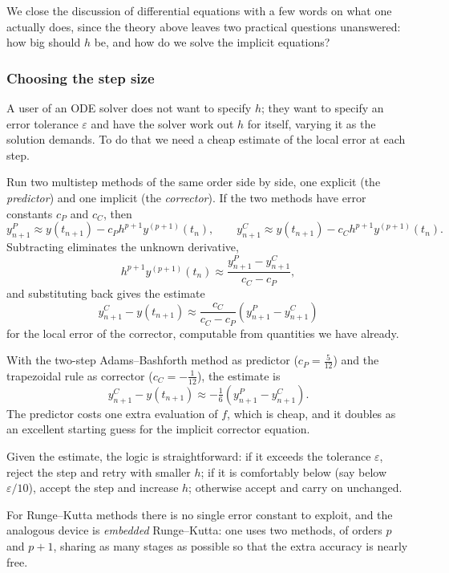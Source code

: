 \documentclass[a4paper]{scrartcl}
\begin{document}
We close the discussion of differential equations with a few words on what one actually does, since the theory above leaves two practical questions unanswered: how big should $h$ be, and how do we solve the implicit equations?

\subsubsection*{Choosing the step size}

A user of an ODE solver does not want to specify $h$; they want to specify an error tolerance $\varepsilon$ and have the solver work out $h$ for itself, varying it as the solution demands. To do that we need a cheap estimate of the local error at each step.

\begin{method}
  Run two multistep methods of the same order side by side, one explicit (the \emph{predictor}) and one implicit (the \emph{corrector}). If the two methods have error constants $c_P$ and $c_C$, then
  $$
  y^{P}_{n+1} \approx y(t_{n+1}) - c_P h^{p+1}y^{(p+1)}(t_n), \qquad y^{C}_{n+1} \approx y(t_{n+1}) - c_C h^{p+1}y^{(p+1)}(t_n).
  $$
  Subtracting eliminates the unknown derivative,
  $$
  h^{p+1}y^{(p+1)}(t_n) \approx \frac{y^P_{n+1} - y^C_{n+1}}{c_C - c_P},
  $$
  and substituting back gives the estimate
  $$
  y^C_{n+1} - y(t_{n+1}) \approx \frac{c_C}{c_C - c_P}\left(y^P_{n+1} - y^C_{n+1}\right)
  $$
  for the local error of the corrector, computable from quantities we have already.
\end{method}

\begin{example}
  With the two-step Adams--Bashforth method as predictor ($c_P = \tfrac{5}{12}$) and the trapezoidal rule as corrector ($c_C = -\tfrac1{12}$), the estimate is
  $$
  y^{C}_{n+1} - y(t_{n+1}) \approx -\tfrac16\left(y^{P}_{n+1} - y^{C}_{n+1}\right).
  $$
  The predictor costs one extra evaluation of $f$, which is cheap, and it doubles as an excellent starting guess for the implicit corrector equation.
\end{example}

Given the estimate, the logic is straightforward: if it exceeds the tolerance $\varepsilon$, reject the step and retry with smaller $h$; if it is comfortably below (say below $\varepsilon/10$), accept the step and increase $h$; otherwise accept and carry on unchanged.

For Runge--Kutta methods there is no single error constant to exploit, and the analogous device is \emph{embedded} Runge--Kutta: one uses two methods, of orders $p$ and $p+1$, sharing as many stages as possible so that the extra accuracy is nearly free.
\end{document}
